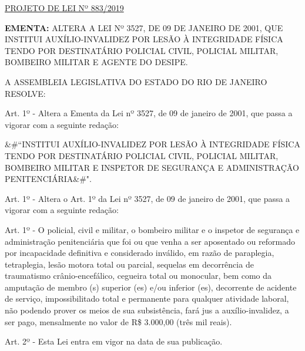 \documentclass[10pt]{article}
\date{}
\begin{document}
\maketitle
\begin{center}
  \huge
  \vspace{-3cm}\href{http://alerjln1.alerj.rj.gov.br/scpro1923.nsf/f4b46b3cdbba990083256cc900746cf6/9c1d2619dc13c83e8325842c005bd7b4?OpenDocument}{PROJETO DE LEI Nº 883/2019}
\bigskip
\bigskip
\bigskip
  
\end{center}

\textbf{EMENTA:} 
ALTERA A LEI Nº 3527, DE 09 DE JANEIRO DE 2001, QUE INSTITUI AUXÍLIO-INVALIDEZ POR LESÃO À INTEGRIDADE FÍSICA TENDO POR DESTINATÁRIO POLICIAL CIVIL, POLICIAL MILITAR, BOMBEIRO MILITAR E AGENTE DO DESIPE.








\bigskip

\noindent
A ASSEMBLEIA LEGISLATIVA DO ESTADO DO RIO DE JANEIRO RESOLVE:

\begin{enumerate}[label=Art. \arabic*\textdegree]
	Art. 1º - Altera a Ementa da Lei nº 3527, de 09 de janeiro de 2001, que passa a vigorar com a seguinte redação:

	&#``INSTITUI AUXÍLIO-INVALIDEZ POR LESÃO À INTEGRIDADE FÍSICA TENDO POR DESTINATÁRIO POLICIAL CIVIL, POLICIAL MILITAR, BOMBEIRO MILITAR E INSPETOR DE SEGURANÇA E ADMINISTRAÇÃO PENITENCIÁRIA&#".

	Art. 1º - Altera o Art. 1º da Lei nº 3527, de 09 de janeiro de 2001, que passa a vigorar com a seguinte redação:

	Art. 1º - O policial, civil e militar, o bombeiro militar e o inspetor de segurança e administração penitenciária que foi ou que venha a ser aposentado ou reformado por incapacidade definitiva e considerado inválido, em razão de paraplegia, tetraplegia, lesão motora total ou parcial,  sequelas em decorrência de traumatismo crânio-encefálico, cegueira total ou monocular, bem como da amputação de membro (s) superior (es) e/ou inferior (es), decorrente de acidente de serviço, impossibilitado total e permanente para qualquer atividade laboral, não podendo prover os meios de sua subsistência, fará jus a auxílio-invalidez, a ser pago, mensalmente no valor de R\$ 3.000,00 (três mil reais).

	Art. 2º - Esta Lei entra em vigor na data de sua publicação.


\end{enumerate}
\end{document}
